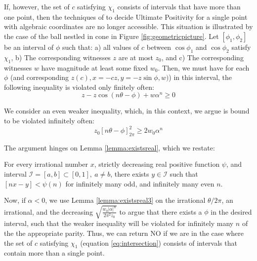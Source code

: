 If, however, the set of $c$ satisfying $\chi_1$ consists of intervals that have more than one point, then the techniques of \cite{ouaknine2014ultimate} to decide Ultimate Positivity for a single point with algebraic coordinates are no longer accessible. This situation is illustrated by the case of the ball nestled in cone in Figure \ref{fig:geometricpicture}. Let $[\phi_1, \phi_2]$ be an interval of $\phi$ such that: a) all values of $c$ between $\cos\phi_1$ and $\cos\phi_2$ satisfy $\chi_1$, b) The corresponding witnesses $z$ are at most $z_0$, and c) The corresponding witnesses $w$ have magnitude at least some fixed $w_0$. Then, we must have for each $\phi$ (and corresponding $z(c), x = -cz, y = -z\sin \phi, w)$) in this interval, the following inequality is violated only finitely often:
\begin{equation}
z - z\cos(n\theta - \phi) + w\alpha^n \ge 0
\end{equation}

We consider an even weaker inequality, which, in this context, we argue is bound to be violated infinitely often:
\begin{equation}
z_0[n\theta - \phi]_{2\pi}^2  \ge 2w_0\alpha^n
\end{equation}

The argument hinges on Lemma \ref{lemma:existsreal}, which we restate:
\begin{lemma}
\label{lemma:existsreal3}
For every irrational number $x$, strictly decreasing real positive function $\psi$, and interval $\mathcal{I} = [a, b] \subset [0, 1], ~ a \ne b$, there exists $y \in \mathcal{I}$ such that $[nx - y] < \psi(n)$ for infinitely many odd, and infinitely many even $n$.
\end{lemma}

Now, if $\alpha < 0$, we use Lemma \ref{lemma:existsreal3} on the irrational $\theta/2\pi$, an irrational, and the decreasing $\sqrt{\frac{w_0 |\alpha|^n}{2\pi^2z_0}}$ to argue that there exists a $\phi$ in the desired interval, such that the weaker inequality will be violated for infinitely many $n$ of the the appropriate parity. Thus, we can return NO if we are in the case where the set of $c$ satisfying $\chi_1$ (equation \ref{eq:intersection}) consists of intervals that contain more than a single point.

